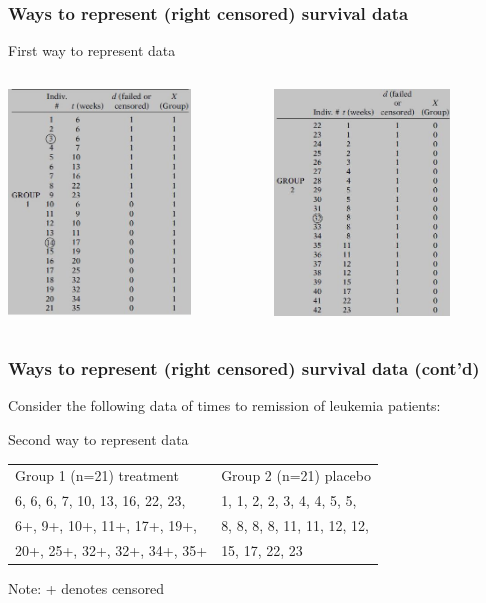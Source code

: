 \documentclass{beamer}
\theoremstyle{definition}
\begin{document}
\begin{frame}
\frametitle{Ways to represent (right censored) survival data}
\begin{block}{First way to represent data }
\begin{columns}
    \begin{column}{0.48\textwidth}
        \includegraphics[width =\textwidth, height=6cm]{Ch1-leuk_dat_a.JPG}
    \end{column}
    \hspace{-10pt}
    \begin{column}{0.48\textwidth}
         \includegraphics[width =\textwidth, height=6cm]{Ch1-leuk_dat_b.JPG}
    \end{column}
\end{columns}
\end{block}
\end{frame}

\begin{frame}
\frametitle{Ways to represent (right censored) survival data (cont'd)}
Consider the following data of times to remission of leukemia patients:
\begin{block}{Second way to represent data }
\begin{table}
\begin{center}
\begin{tabular}{l l}
Group 1 (n=21) treatment & Group 2 (n=21) placebo \\
 6, 6, 6, 7, 10, 13, 16, 22, 23, & 1, 1, 2, 2, 3, 4, 4, 5, 5,  \\
 6+, 9+, 10+, 11+, 17+, 19+, & 8, 8, 8, 8, 11, 11, 12, 12, \\
   20+, 25+, 32+, 32+, 34+, 35+ & 15, 17, 22, 23
\end{tabular}
\end{center}
\end{table}
Note: + denotes censored
\end{block}
\end{frame}
\end{document}

